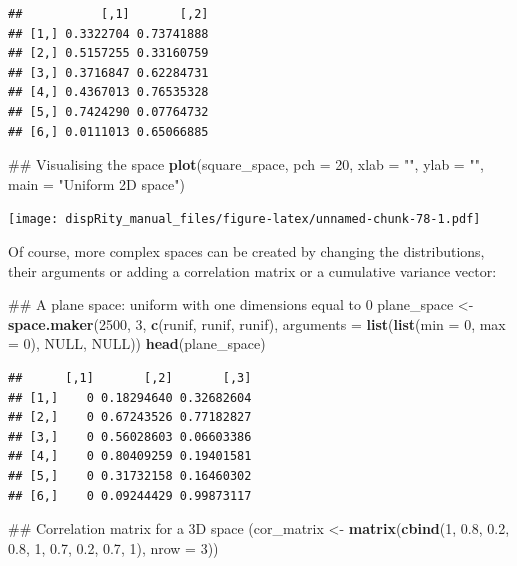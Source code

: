 \documentclass[]{book}
\newenvironment{Shaded}{\begin{snugshade}}{\end{snugshade}}
\newcommand{\KeywordTok}[1]{\textcolor[rgb]{0.13,0.29,0.53}{\textbf{#1}}}
\newcommand{\DataTypeTok}[1]{\textcolor[rgb]{0.13,0.29,0.53}{#1}}
\newcommand{\DecValTok}[1]{\textcolor[rgb]{0.00,0.00,0.81}{#1}}
\newcommand{\FloatTok}[1]{\textcolor[rgb]{0.00,0.00,0.81}{#1}}
\newcommand{\StringTok}[1]{\textcolor[rgb]{0.31,0.60,0.02}{#1}}
\newcommand{\OtherTok}[1]{\textcolor[rgb]{0.56,0.35,0.01}{#1}}
\newcommand{\NormalTok}[1]{#1}
\theoremstyle{definition}
\theoremstyle{definition}
\theoremstyle{remark}
\begin{document}
\begin{verbatim}
##           [,1]       [,2]
## [1,] 0.3322704 0.73741888
## [2,] 0.5157255 0.33160759
## [3,] 0.3716847 0.62284731
## [4,] 0.4367013 0.76535328
## [5,] 0.7424290 0.07764732
## [6,] 0.0111013 0.65066885
\end{verbatim}

\begin{Shaded}
\begin{Highlighting}[]
\NormalTok{## Visualising the space}
\KeywordTok{plot}\NormalTok{(square_space, }\DataTypeTok{pch =} \DecValTok{20}\NormalTok{, }\DataTypeTok{xlab =} \StringTok{""}\NormalTok{, }\DataTypeTok{ylab =} \StringTok{""}\NormalTok{, }\DataTypeTok{main =} \StringTok{"Uniform 2D space"}\NormalTok{)}
\end{Highlighting}
\end{Shaded}

\texttt{[image: dispRity\_manual\_files/figure-latex/unnamed-chunk-78-1.pdf]}

Of course, more complex spaces can be created by changing the
distributions, their arguments or adding a correlation matrix or a
cumulative variance vector:

\begin{Shaded}
\begin{Highlighting}[]
\NormalTok{## A plane space: uniform with one dimensions equal to 0}
\NormalTok{plane_space <-}\StringTok{ }\KeywordTok{space.maker}\NormalTok{(}\DecValTok{2500}\NormalTok{, }\DecValTok{3}\NormalTok{, }\KeywordTok{c}\NormalTok{(runif, runif, runif),}
                           \DataTypeTok{arguments =} \KeywordTok{list}\NormalTok{(}\KeywordTok{list}\NormalTok{(}\DataTypeTok{min =} \DecValTok{0}\NormalTok{, }\DataTypeTok{max =} \DecValTok{0}\NormalTok{), }\OtherTok{NULL}\NormalTok{, }\OtherTok{NULL}\NormalTok{))}
\KeywordTok{head}\NormalTok{(plane_space)}
\end{Highlighting}
\end{Shaded}

\begin{verbatim}
##      [,1]       [,2]       [,3]
## [1,]    0 0.18294640 0.32682604
## [2,]    0 0.67243526 0.77182827
## [3,]    0 0.56028603 0.06603386
## [4,]    0 0.80409259 0.19401581
## [5,]    0 0.31732158 0.16460302
## [6,]    0 0.09244429 0.99873117
\end{verbatim}

\begin{Shaded}
\begin{Highlighting}[]
\NormalTok{## Correlation matrix for a 3D space}
\NormalTok{(cor_matrix <-}\StringTok{ }\KeywordTok{matrix}\NormalTok{(}\KeywordTok{cbind}\NormalTok{(}\DecValTok{1}\NormalTok{, }\FloatTok{0.8}\NormalTok{, }\FloatTok{0.2}\NormalTok{, }\FloatTok{0.8}\NormalTok{, }\DecValTok{1}\NormalTok{, }\FloatTok{0.7}\NormalTok{, }\FloatTok{0.2}\NormalTok{, }\FloatTok{0.7}\NormalTok{, }\DecValTok{1}\NormalTok{), }\DataTypeTok{nrow =} \DecValTok{3}\NormalTok{))}
\end{Highlighting}
\end{Shaded}
\end{document}
